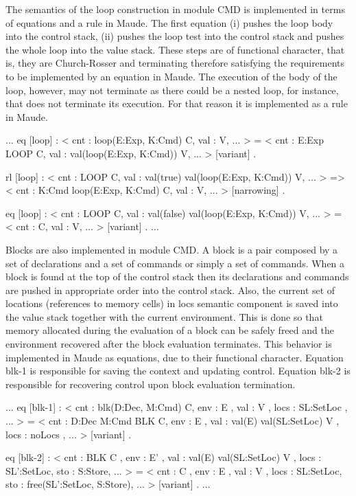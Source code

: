\documentclass{llncs}%
\begin{document}
The semantics of the loop construction in module CMD is implemented in terms of equations and a rule in Maude. The first equation (i) pushes the loop body into the control stack, (ii) pushes the loop test into the control stack and pushes the whole loop into the value stack. These steps are of functional character, that is, they are Church-Rosser and terminating therefore satisfying the requirements to be implemented by an equation in Maude. The execution of the body of the loop, however, may not terminate as there could be a nested loop, for instance, that does not terminate its execution. For that reason it is implemented as a rule in Maude. 
\begin{maude}[caption=$\uppi$-automaton rules for loop, label=lst:gia-loop-maude]
    $\ldots$
    eq [loop] :
        < cnt : loop(E:Exp, K:Cmd) C, val : V, ... > 
     =
        < cnt : E:Exp LOOP C,
          val : val(loop(E:Exp, K:Cmd)) V, ... > [variant] .

    rl [loop] :
        < cnt : LOOP C,
          val : val(true) val(loop(E:Exp, K:Cmd)) V, ... > 
    =>
        < cnt : K:Cmd loop(E:Exp, K:Cmd) C, val : V, ... > [narrowing] .

    eq [loop] :
        < cnt : LOOP C,
          val : val(false) val(loop(E:Exp, K:Cmd)) V, ... > 
     =
        < cnt : C, val : V, ... > [variant] .
    $\ldots$        
\end{maude}

Blocks are also implemented in module CMD. A block is a pair composed by a set of declarations and a set of commands or simply a set of commands. When a block is found at the top of the control stack then its declarations and commands are pushed in appropriate order into the control stack. Also, the current set of locations (references to memory cells) in locs semantic component is saved into the value stack together with the current environment. This is done so that memory allocated during the evaluation of a block can be safely freed and the environment recovered after the block evaluation terminates. This behavior is implemented in Maude as equations, due to their functional character.  Equation blk-1 is responsible for saving the context and updating control. Equation blk-2 is responsible for recovering control upon block evaluation termination.
\begin{maude}[caption=$\uppi$-automaton rules for block, label=lst:gia-block-maude]
    $\ldots$
    eq [blk-1] :
        < cnt : blk(D:Dec, M:Cmd) C, env : E , val : V , locs : SL:Set{Loc} , ... > 
     =
        < cnt : D:Dec M:Cmd BLK C, env : E , 
          val : val(E) val(SL:Set{Loc}) V , 
          locs : noLocs , ... > [variant] .

    eq [blk-2] :
       < cnt : BLK C ,
         env : E' ,
         val : val(E) val(SL:Set{Loc}) V ,
         locs : SL':Set{Loc},
         sto : S:Store, ... > 
     =
       < cnt : C ,
         env : E ,
         val : V ,
         locs : SL:Set{Loc},
         sto : free(SL':Set{Loc}, S:Store), ... > [variant] .
    $\ldots$       
\end{maude}
\end{document}
